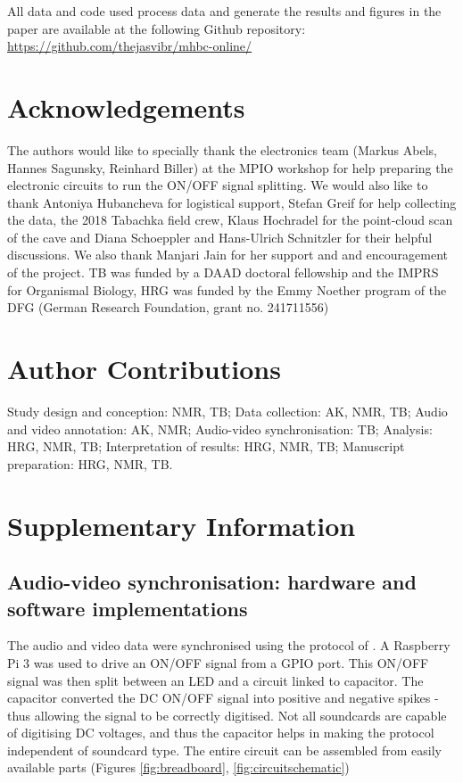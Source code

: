 \documentclass[
]{book}
\begin{document}
All data and code used process data and generate the results and figures in the paper are available at the following Github repository: \url{https://github.com/thejasvibr/mhbc-online/}

\hypertarget{acknowledgements-2}{%
\section{Acknowledgements}\label{acknowledgements-2}}

The authors would like to specially thank the electronics team (Markus Abels, Hannes Sagunsky, Reinhard Biller) at the MPIO workshop for help preparing the electronic circuits to run the ON/OFF signal splitting. We would also like to thank Antoniya Hubancheva for logistical support, Stefan Greif for help collecting the data, the 2018 Tabachka field crew, Klaus Hochradel for the point-cloud scan of the cave and Diana Schoeppler and Hans-Ulrich Schnitzler for their helpful discussions. We also thank Manjari Jain for her support and and encouragement of the project. TB was funded by a DAAD doctoral fellowship and the IMPRS for Organismal Biology, HRG was funded by the Emmy Noether program of the DFG (German Research Foundation, grant no. 241711556)

\hypertarget{author-contributions}{%
\section{Author Contributions}\label{author-contributions}}

Study design and conception: NMR, TB; Data collection: AK, NMR, TB; Audio and video annotation: AK, NMR; Audio-video synchronisation: TB; Analysis: HRG, NMR, TB; Interpretation of results: HRG, NMR, TB; Manuscript preparation: HRG, NMR, TB.

\newpage

\hypertarget{supplementary-information-1}{%
\section{Supplementary Information}\label{supplementary-information-1}}

\hypertarget{avmatching}{%
\subsection{Audio-video synchronisation: hardware and software implementations}\label{avmatching}}

The audio and video data were synchronised using the protocol of \citep{laurijssen2018low}. A Raspberry Pi 3 was used to drive an ON/OFF signal from a GPIO port. This ON/OFF signal was then split between an LED and a circuit linked to capacitor. The capacitor converted the DC ON/OFF signal into positive and negative spikes - thus allowing the signal to be correctly digitised. Not all soundcards are capable of digitising DC voltages, and thus the capacitor helps in making the protocol independent of soundcard type. The entire circuit can be assembled from easily available parts (Figures \ref{fig:breadboard}, \ref{fig:circuitschematic})
\end{document}
